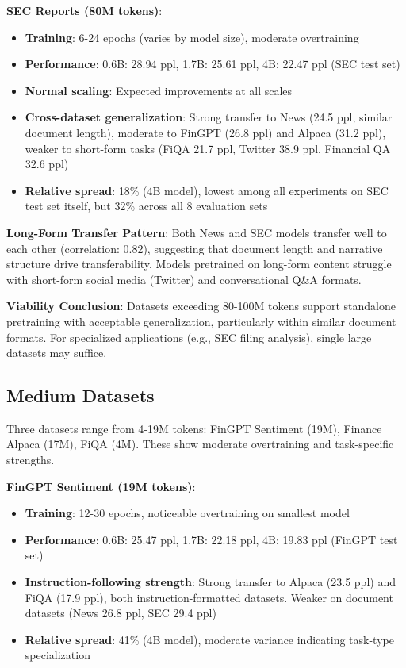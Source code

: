 \textbf{SEC Reports (80M tokens)}:
\begin{itemize}
\item \textbf{Training}: 6-24 epochs (varies by model size), moderate overtraining
\item \textbf{Performance}: 0.6B: 28.94 ppl, 1.7B: 25.61 ppl, 4B: 22.47 ppl (SEC test set)
\item \textbf{Normal scaling}: Expected improvements at all scales
\item \textbf{Cross-dataset generalization}: Strong transfer to News (24.5 ppl, similar document length), moderate to FinGPT (26.8 ppl) and Alpaca (31.2 ppl), weaker to short-form tasks (FiQA 21.7 ppl, Twitter 38.9 ppl, Financial QA 32.6 ppl)
\item \textbf{Relative spread}: 18\% (4B model), lowest among all experiments on SEC test set itself, but 32\% across all 8 evaluation sets
\end{itemize}

\textbf{Long-Form Transfer Pattern}: Both News and SEC models transfer well to each other (correlation: 0.82), suggesting that document length and narrative structure drive transferability. Models pretrained on long-form content struggle with short-form social media (Twitter) and conversational Q\&A formats.

\textbf{Viability Conclusion}: Datasets exceeding 80-100M tokens support standalone pretraining with acceptable generalization, particularly within similar document formats. For specialized applications (e.g., SEC filing analysis), single large datasets may suffice.

\subsection{Medium Datasets}

Three datasets range from 4-19M tokens: FinGPT Sentiment (19M), Finance Alpaca (17M), FiQA (4M). These show moderate overtraining and task-specific strengths.

\textbf{FinGPT Sentiment (19M tokens)}:
\begin{itemize}
\item \textbf{Training}: 12-30 epochs, noticeable overtraining on smallest model
\item \textbf{Performance}: 0.6B: 25.47 ppl, 1.7B: 22.18 ppl, 4B: 19.83 ppl (FinGPT test set)
\item \textbf{Instruction-following strength}: Strong transfer to Alpaca (23.5 ppl) and FiQA (17.9 ppl), both instruction-formatted datasets. Weaker on document datasets (News 26.8 ppl, SEC 29.4 ppl)
\item \textbf{Relative spread}: 41\% (4B model), moderate variance indicating task-type specialization
\end{itemize}

